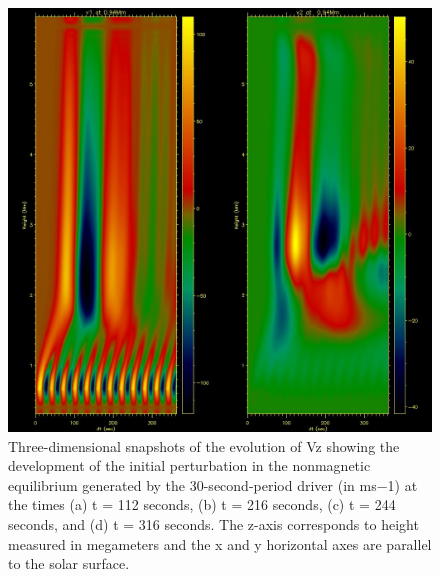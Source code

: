 \documentclass{aa}
\begin{document}
 




\begin{figure}[h]\label{fig30svz_vt_mode0}
\includegraphics[scale=0.5]{images/pm30s_sindrv_n0_4b03d_dt.jpg}
\caption{Three-dimensional snapshots of the evolution of Vz showing the development of the initial perturbation in the nonmagnetic equilibrium generated by the 30-second-period driver (in ms−1) at the times (a) t = 112 seconds, (b) t = 216 seconds, (c) t = 244 seconds, and (d) t = 316 seconds. The z-axis corresponds to height measured in megameters and the x and y horizontal axes are parallel to the solar surface. }
\end{figure}





\end{document}
